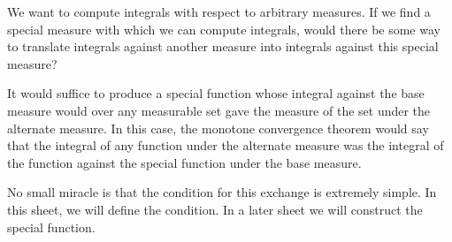 
\sbasic










































\sstart
{}


We want to compute integrals
with respect to arbitrary measures.
If we find a special measure
with which we can compute integrals,
would there
be some way to translate
integrals against another measure
into integrals against this special
measure?

It would suffice to produce a special function
whose integral against the base measure
would over any measurable set gave
the measure of the set under the alternate
measure.
In this case, the monotone convergence
theorem would say that the integral of
any function under the alternate
measure was the integral of the function
against the special function under the
base measure.

No small miracle is that the condition
for this exchange is extremely simple.
In this sheet, we will define the
condition. In a later sheet we will
construct the special function.


